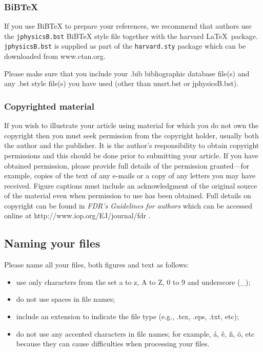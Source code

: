 \documentclass[12pt]{iopart}
\begin{document}
\subsubsection{\bf BiBTeX \label{bibby}}  If you use BiBTeX to prepare your
references, we recommend that authors use the \verb"jphysicsB.bst" BiBTeX style file together with the harvard \LaTeX\ package. \verb"jphysicsB.bst" is supplied as part of the \verb"harvard.sty" package which can be 
downloaded from www.ctan.org.

Please make sure that you include your .bib bibliographic database file(s) and any 
.bst style file(s) you have used (other than unsrt.bst or jphysicsB.bst).

\subsubsection{\bf Copyrighted material} If you wish to illustrate your article using material for which you do not own the copyright then you must seek permission from the copyright holder, usually both the author and the publisher. It is the author's responsibility to obtain copyright permissions and this should be done prior to submitting your article. If you have obtained permission, please provide full details of the permission granted---for example, copies of the text of any e-mails or a copy of any letters you may have received. Figure captions must include an acknowledgment of the original source of the material even when permission to use has been obtained. Full details on copyright can be found in {\it FDR's Guidelines for authors} which can be accessed online at http://www.iop.org/EJ/journal/fdr .

\subsection{Naming your files}
Please name all your files, both figures and text as follows:
\begin{itemize}
\item use only characters from the set a to z, A to Z, 0 to 9 and underscore (\_); 
\item do not use spaces in file names;
\item include an extension to indicate the file type (e.g., .tex, .eps, .txt, etc);
\item do not use any accented characters in file names; for example, \'a, \^e, \~n, \"o, etc because 
they can cause difficulties when processing your files.
\end{itemize}
\end{document}
